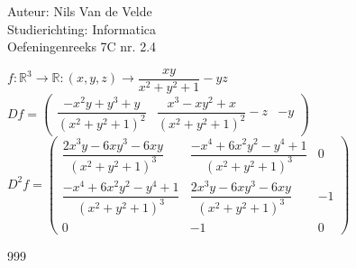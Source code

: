 \documentclass[a4paper]{article}
\newcommand{\R}{\mathbb{R}}
\begin{document}
  
\noindent \large Auteur: Nils Van de Velde \\
\noindent \large Studierichting: Informatica\\
\noindent \large Oefeningenreeks 7C nr. 2.4\\

\medskip

\normalsize

$f:\R^3 \rightarrow \R:(x,y,z) \rightarrow \dfrac{xy}{x^2+y^2+1}-yz$\\

$Df = \left(
\begin{array}{ccc}
\dfrac{-x^2y+y^3+y}{(x^2+y^2+1)^2} & \dfrac{x^3-xy^2+x}{(x^2+y^2+1)^2}-z & -y 
\end{array}
\right)$\\

$D^2f = \left(
\begin{array}{ccc}
	\dfrac{2x^3y-6xy^3-6xy}{(x^2+y^2+1)^3} & \dfrac{-x^4+6x^2y^2-y^4+1}{(x^2+y^2+1)^3} & 0 \\
	\dfrac{-x^4+6x^2y^2-y^4+1}{(x^2+y^2+1)^3} & \dfrac{2x^3y-6xy^3-6xy}{(x^2+y^2+1)^3} & -1 \\
	0 & -1 & 0
\end{array}
\right)$\\

\begin{thebibliography}{999}
\end{thebibliography}
\end{document}
